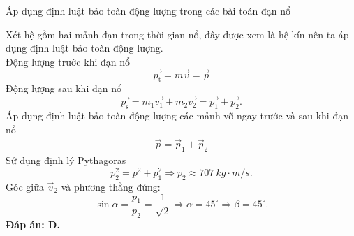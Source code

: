 \begin{dang}{Áp dụng định luật bảo toàn động lượng trong các bài toán đạn nổ}
{{\begin{center}
			\end{center}
			Xét hệ gồm hai mảnh đạn trong thời gian nổ, đây được xem là hệ kín nên ta áp dụng định luật bảo toàn động lượng.\\
			Động lượng trước khi đạn nổ
			\begin{equation*}
				\vec{p_{\text{t}}} =m\vec{v}=\vec p
			\end{equation*}
			Động lượng sau khi đạn nổ
			\begin{equation*}
				\vec{p_{\text{s}}}=m_1\vec{v_1}+m_2 \vec{v_2} =\vec{p_1} + \vec{p_2}. 
			\end{equation*}
			Áp dụng định luật bảo toàn động lượng các mảnh vỡ ngay trước và sau khi đạn nổ
			\begin{align*}
				\vec{p}=\vec{p}_1+\vec{p}_2
			\end{align*}
			Sử dụng định lý Pythagoras
			\begin{equation*}
				p^2_2 =p^2+p^2_1 \Rightarrow p_2 \approx\SI{707}{kg \cdot m/s}.
			\end{equation*}
			Góc giữa $\vec v_2$ và phương thẳng đứng: 
			\begin{equation*}
				\sin \alpha = \dfrac{p_1}{p_2} = \dfrac{1}{\sqrt 2} \Rightarrow \alpha = 45^\circ \Rightarrow \beta = 45^\circ.
			\end{equation*}
			\textbf{Đáp án: D.}}
	}
	
\end{dang}